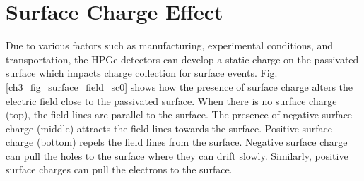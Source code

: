 \section{Surface Charge Effect}
Due to various factors such as manufacturing, experimental conditions, and transportation, the HPGe detectors can develop a static charge on the passivated surface which impacts charge collection for surface events. Fig. \ref{ch3_fig_surface_field_sc0} shows how the presence of surface charge alters the electric field close to the passivated surface. When there is no surface charge (top), the field lines are parallel to the surface. The presence of negative surface charge (middle) attracts the field lines towards the surface. Positive surface charge (bottom) repels the field lines from the surface. Negative surface charge can pull the holes to the surface where they can drift slowly. Similarly, positive surface charges can pull the electrons to the surface.


